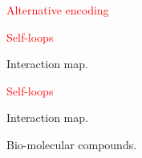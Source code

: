 \documentclass[landscape,20pt]{transparents2e}
\newcommand{\red}{\textcolor{red}}
\renewcommand{\frametitle}[1]{\red{\HUGE #1 }}
\begin{document}
\begin{slide}{\frametitle{Alternative encoding}}

\end{slide}

\begin{slide}{\frametitle{Self-loops}}

\vspace*{2cm}

\begin{minipage}{\linewidth}
  {\begin{minipage}{\linewidth}
  \begin{center}

Interaction map.
  \end{center}
  \end{minipage}}
\end{minipage}

\end{slide}

\begin{slide}{\frametitle{Self-loops}}

\vspace*{2cm}

\begin{minipage}{\linewidth}
  \begin{minipage}{0.35\linewidth}
    {\begin{minipage}{\linewidth}
    \begin{center}

Interaction map.
    \end{center}
    \end{minipage}}
  \end{minipage}
  \begin{minipage}{0.64\linewidth}
    \begin{center}
      \hspace*{5mm}
      \hspace*{5mm}

    Bio-molecular compounds.
  \end{center}

  \end{minipage}
\end{minipage}

\end{slide}
\end{document}
